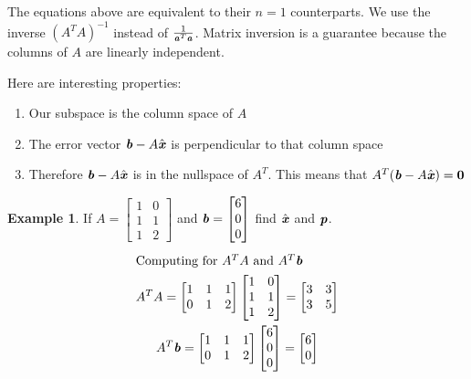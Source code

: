 \documentclass[12pt, letterpaper]{article}
\newcommand{\V}[1]{\textbf{\textit{#1}}}
\theoremstyle{definition}
\newtheorem{example}{Example}
\begin{document}
	The equations above are equivalent to their $n = 1$ counterparts. We use the inverse $(A^T A)^{-1}$ instead of $\frac{1}{\V{a}^T\V{a}}$. Matrix inversion is a guarantee because the columns of $A$ are linearly independent.
	
	\noindent Here are interesting properties:
		\begin{enumerate}
			\item Our subspace is the column space of $A$
			\item The error vector $\V{b} - A\hat{\V{x}}$ is perpendicular to that column space
			\item Therefore $\V{b} - A\hat{\V{x}}$ is in the nullspace of $A^T$. This means that $A^T(\V{b} - A\hat{\V{x}})=\textbf{0}$ 
		\end{enumerate}

	\begin{example}
		If $A = \begin{bmatrix} 1 & 0\\ 1 & 1 \\ 1&2 \end{bmatrix}$ and $\V{b} = \begin{bmatrix} 6 \\ 0 \\ 0 \end{bmatrix}$ find $\hat{\V{x}}$ and $\V{p}$.
		\begin{gather*}
		\intertext{Computing for $A^T A$ and $A^T \V{b}$}
			A^T A = \begin{bmatrix} 1 & 1 & 1\\ 0 & 1 & 2 \end{bmatrix} \begin{bmatrix} 1 & 0\\ 1 & 1 \\ 1&2 \end{bmatrix} = \begin{bmatrix}
																																3 & 3 \\
																																3 & 5
																																\end{bmatrix} \\
			A^T \V{b} = \begin{bmatrix} 1 & 1 & 1\\ 0 & 1 & 2 \end{bmatrix} \begin{bmatrix} 6 \\ 0 \\ 0 \end{bmatrix} = \begin{bmatrix}6 \\ 0\end{bmatrix} \\

\end{gather*}
\end{example}
\end{document}
